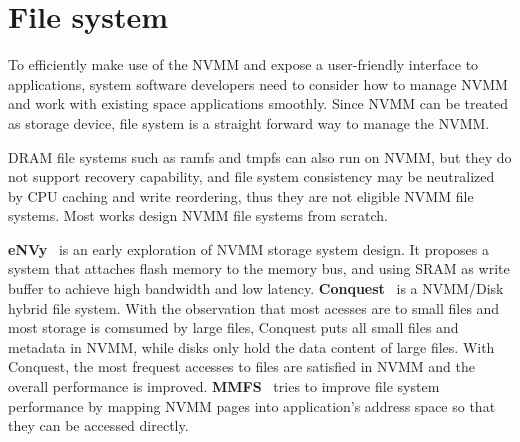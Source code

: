 \section{File system} 
\label{sec:fs}

To efficiently make use of the NVMM and expose a user-friendly
interface to applications, system software developers need to consider
how to manage NVMM and work with existing space applications smoothly.
Since NVMM can be treated as storage device, file system is a straight forward
way to manage the NVMM.

DRAM file systems such as ramfs and tmpfs can also run on NVMM, but they
do not support recovery capability, and file system consistency may be 
neutralized by
CPU caching and write reordering, thus they are not eligible NVMM file systems.
Most works design NVMM file systems from scratch. 

\textbf{eNVy}~\cite{eNVy} is an early exploration of NVMM storage system
design. It proposes a system that attaches flash memory to the memory
bus, and using SRAM as write buffer to achieve high bandwidth and low latency.
\textbf{Conquest}~\cite{conquest} is a NVMM/Disk hybrid file system.
With the observation that most acesses are to small files and most storage is
comsumed by large files, Conquest puts all small files and metadata in NVMM,
while disks only hold the data content of large files. With Conquest, the most
frequest accesses to files are satisfied in NVMM and the overall performance is
improved. \textbf{MMFS}~\cite{mmfs} tries to improve file system performance by
mapping NVMM pages into application's address space so that they can be accessed
directly. 


